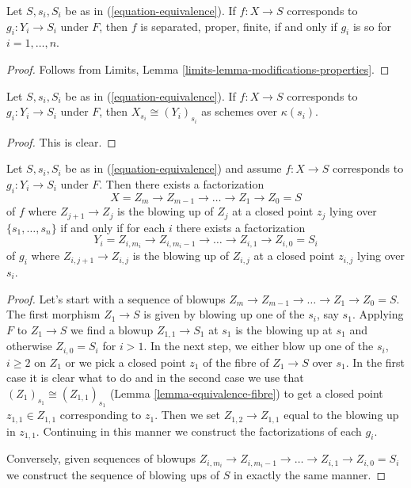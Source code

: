 \begin{lemma}
\label{lemma-equivalence-properties}
Let $S, s_i, S_i$ be as in (\ref{equation-equivalence}).
If $f : X \to S$ corresponds to $g_i : Y_i \to S_i$ under $F$,
then $f$ is separated, proper, finite, if and only if $g_i$ is so
for $i = 1, \ldots, n$.
\end{lemma}

\begin{proof}
Follows from Limits, Lemma
\ref{limits-lemma-modifications-properties}.
\end{proof}

\begin{lemma}
\label{lemma-equivalence-fibre}
Let $S, s_i, S_i$ be as in (\ref{equation-equivalence}).
If $f : X \to S$ corresponds to $g_i : Y_i \to S_i$ under $F$,
then $X_{s_i} \cong (Y_i)_{s_i}$ as schemes over $\kappa(s_i)$.
\end{lemma}

\begin{proof}
This is clear.
\end{proof}

\begin{lemma}
\label{lemma-equivalence-sequence-blowups}
Let $S, s_i, S_i$ be as in (\ref{equation-equivalence})
and assume $f : X \to S$ corresponds to $g_i : Y_i \to S_i$ under $F$.
Then there exists a factorization
$$
X = Z_m \to Z_{m - 1} \to \ldots \to Z_1 \to Z_0 = S
$$
of $f$ where $Z_{j + 1} \to Z_j$ is the blowing up of $Z_j$ at a closed
point $z_j$ lying over $\{s_1, \ldots, s_n\}$ if and only if for each
$i$ there exists a factorization
$$
Y_i = Z_{i, m_i} \to Z_{i, m_i - 1} \to \ldots \to Z_{i, 1} \to Z_{i, 0} = S_i
$$
of $g_i$ where $Z_{i, j + 1} \to Z_{i, j}$ is the blowing up of $Z_{i, j}$
at a closed point $z_{i, j}$ lying over $s_i$.
\end{lemma}

\begin{proof}
Let's start with a sequence of blowups
$Z_m \to Z_{m - 1} \to \ldots \to Z_1 \to Z_0 = S$.
The first morphism $Z_1 \to S$ is given
by blowing up one of the $s_i$, say $s_1$. Applying $F$
to $Z_1 \to S$ we find a blowup $Z_{1, 1} \to S_1$ at $s_1$
is the blowing up at $s_1$ and otherwise $Z_{i, 0} = S_i$ for $i > 1$.
In the next step, we either blow up one of the $s_i$, $i \geq 2$
on $Z_1$ or we pick a closed point $z_1$ of the fibre of $Z_1 \to S$
over $s_1$. In the first case it is clear what to do and in
the second case we use that $(Z_1)_{s_1} \cong (Z_{1, 1})_{s_1}$
(Lemma \ref{lemma-equivalence-fibre})
to get a closed point $z_{1, 1} \in Z_{1, 1}$ corresponding to $z_1$.
Then we set $Z_{1, 2} \to Z_{1, 1}$ equal to the blowing up
in $z_{1, 1}$. Continuing in this manner we construct the factorizations
of each $g_i$.

\medskip\noindent
Conversely, given sequences of blowups
$Z_{i, m_i} \to Z_{i, m_i - 1} \to \ldots \to Z_{i, 1} \to Z_{i, 0} = S_i$
we construct the sequence of blowing ups of $S$ in exactly the same manner.
\end{proof}

